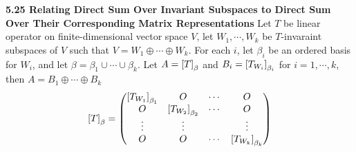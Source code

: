 \documentclass[11pt]{article}
\begin{document}
\begin{theorem*}
    \textbf{5.25 Relating Direct Sum Over Invariant Subspaces to Direct Sum Over Their Corresponding Matrix Representations} Let $T$ be linear operator on finite-dimensional vector space $V$, let $W_1,\cdots, W_k$ be $T$-invaraint subspaces of $V$ such that $V = W_1 \oplus \cdots \oplus W_k$. For each $i$, let $\beta_i$ be an ordered basis for $W_i$, and let $\beta =\beta_1 \cup \cdots \cup \beta_k$. Let $A = \left[ T \right]_{\beta}$ and $B_i = \left[ T_{W_i} \right]_{\beta_i}$ for $i=1,\cdots, k$, then $A = B_1 \oplus \cdots \oplus B_k$ 
    \[
        \left[ T \right]_{\beta} = 
        \begin{pmatrix}
            \left[ T_{W_1} \right]_{\beta_1} & O & \cdots & O \\ 
            O & \left[ T_{W_2} \right]_{\beta_2} & \cdots & O \\ 
            \vdots & \vdots & & \vdots \\
            O & O & \cdots & \left[ T_{W_k} \right]_{\beta_k} \\ 
        \end{pmatrix}    
    \]
\end{theorem*} 
\end{document}
